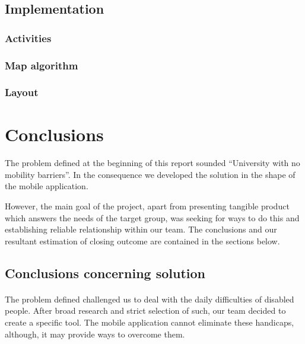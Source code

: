 \documentclass[12pt]{article}
\begin{document}
\subsection{Implementation}
\subsubsection{Activities}
\subsubsection{Map algorithm}
\subsubsection{Layout}

\section{Conclusions}
\paragraph{}
The problem defined at the beginning of this report sounded ``University with no mobility barriers''.
In the consequence we developed the solution in the shape of the mobile application.

However, the main goal of the project, apart from presenting tangible product which answers the needs of the target group, was seeking for ways to do this and establishing reliable relationship within our team.
The conclusions and our resultant estimation of closing outcome are contained in the sections below.

\subsection{Conclusions concerning solution}
\paragraph{}
The problem defined challenged us to deal with the daily difficulties of disabled people.
After broad research and strict selection of such, our team decided to create a specific tool.
The mobile application cannot eliminate these handicaps, although, it may provide ways to overcome them.
\end{document}
